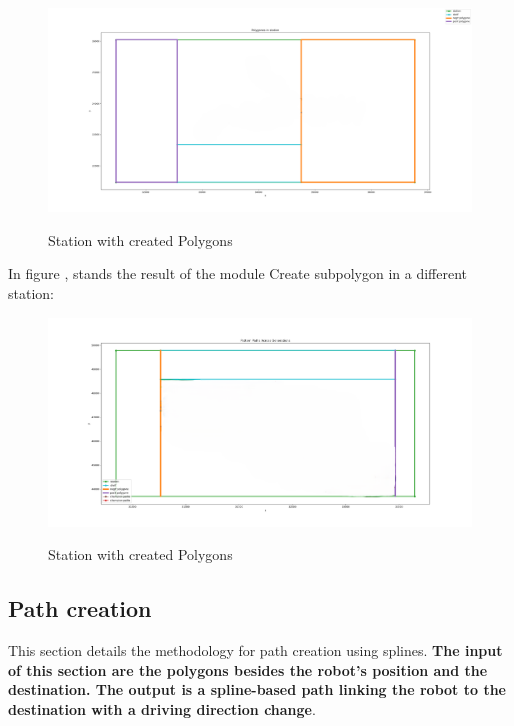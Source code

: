 \begin{figure}[H]
    \begin{center}
        \includegraphics[width=5in]{images/Chap2/Polygons_created.png}\\
        \caption{Station with created Polygons}
        \label{Station polygon}
        \end{center}    
\end{figure}

In figure , stands the result of the module Create subpolygon in a different station:
\begin{figure}[H]
    \begin{center}
        \includegraphics[width=5in]{images/Chap2/Other_station.png}\\
        \caption{Station with created Polygons}
        \label{other station}
        \end{center}    
\end{figure}

\subsection{Path creation}
This section details the methodology for path creation using splines. \textbf{The input of this section are the polygons besides
the robot's position and the destination. The output is a spline-based path linking the robot to the destination with a 
driving direction change}.

